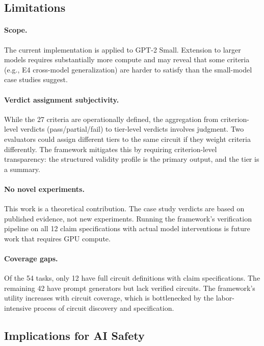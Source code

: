 \documentclass[10pt]{article}
\newcommand{\eg}{e.g.}
\begin{document}
\subsection{Limitations}

\paragraph{Scope.} The current implementation is applied to GPT-2 Small. Extension to larger models requires substantially more compute and may reveal that some criteria (\eg, E4 cross-model generalization) are harder to satisfy than the small-model case studies suggest.

\paragraph{Verdict assignment subjectivity.} While the 27 criteria are operationally defined, the aggregation from criterion-level verdicts (pass/partial/fail) to tier-level verdicts involves judgment. Two evaluators could assign different tiers to the same circuit if they weight criteria differently. The framework mitigates this by requiring criterion-level transparency: the structured validity profile is the primary output, and the tier is a summary.

\paragraph{No novel experiments.} This work is a theoretical contribution. The case study verdicts are based on published evidence, not new experiments. Running the framework's verification pipeline on all 12 claim specifications with actual model interventions is future work that requires GPU compute.

\paragraph{Coverage gaps.} Of the 54 tasks, only 12 have full circuit definitions with claim specifications. The remaining 42 have prompt generators but lack verified circuits. The framework's utility increases with circuit coverage, which is bottlenecked by the labor-intensive process of circuit discovery and specification.

\subsection{Implications for AI Safety}
\end{document}
